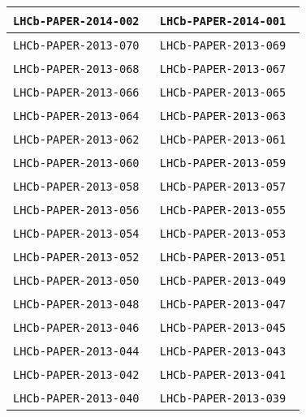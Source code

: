 \begin{center}
\begin{longtable}{ll}
\texttt{LHCb-PAPER-2014-002}~\cite{LHCb-PAPER-2014-002} &
\texttt{LHCb-PAPER-2014-001}~\cite{LHCb-PAPER-2014-001} \\
\midrule
\texttt{LHCb-PAPER-2013-070}~\cite{LHCb-PAPER-2013-070} &
\texttt{LHCb-PAPER-2013-069}~\cite{LHCb-PAPER-2013-069} \\
\texttt{LHCb-PAPER-2013-068}~\cite{LHCb-PAPER-2013-068} &
\texttt{LHCb-PAPER-2013-067}~\cite{LHCb-PAPER-2013-067} \\
\texttt{LHCb-PAPER-2013-066}~\cite{LHCb-PAPER-2013-066} &
\texttt{LHCb-PAPER-2013-065}~\cite{LHCb-PAPER-2013-065} \\
\texttt{LHCb-PAPER-2013-064}~\cite{LHCb-PAPER-2013-064} &
\texttt{LHCb-PAPER-2013-063}~\cite{LHCb-PAPER-2013-063} \\
\texttt{LHCb-PAPER-2013-062}~\cite{LHCb-PAPER-2013-062} &
\texttt{LHCb-PAPER-2013-061}~\cite{LHCb-PAPER-2013-061} \\
\texttt{LHCb-PAPER-2013-060}~\cite{LHCb-PAPER-2013-060} &
\texttt{LHCb-PAPER-2013-059}~\cite{LHCb-PAPER-2013-059} \\
\texttt{LHCb-PAPER-2013-058}~\cite{LHCb-PAPER-2013-058} &
\texttt{LHCb-PAPER-2013-057}~\cite{LHCb-PAPER-2013-057} \\
\texttt{LHCb-PAPER-2013-056}~\cite{LHCb-PAPER-2013-056} &
\texttt{LHCb-PAPER-2013-055}~\cite{LHCb-PAPER-2013-055} \\
\texttt{LHCb-PAPER-2013-054}~\cite{LHCb-PAPER-2013-054} &
\texttt{LHCb-PAPER-2013-053}~\cite{LHCb-PAPER-2013-053} \\
\texttt{LHCb-PAPER-2013-052}~\cite{LHCb-PAPER-2013-052} &
\texttt{LHCb-PAPER-2013-051}~\cite{LHCb-PAPER-2013-051} \\
\texttt{LHCb-PAPER-2013-050}~\cite{LHCb-PAPER-2013-050} &
\texttt{LHCb-PAPER-2013-049}~\cite{LHCb-PAPER-2013-049} \\
\texttt{LHCb-PAPER-2013-048}~\cite{LHCb-PAPER-2013-048} &
\texttt{LHCb-PAPER-2013-047}~\cite{LHCb-PAPER-2013-047} \\
\texttt{LHCb-PAPER-2013-046}~\cite{LHCb-PAPER-2013-046} &
\texttt{LHCb-PAPER-2013-045}~\cite{LHCb-PAPER-2013-045} \\
\texttt{LHCb-PAPER-2013-044}~\cite{LHCb-PAPER-2013-044} &
\texttt{LHCb-PAPER-2013-043}~\cite{LHCb-PAPER-2013-043} \\
\texttt{LHCb-PAPER-2013-042}~\cite{LHCb-PAPER-2013-042} &
\texttt{LHCb-PAPER-2013-041}~\cite{LHCb-PAPER-2013-041} \\
\texttt{LHCb-PAPER-2013-040}~\cite{LHCb-PAPER-2013-040} &
\texttt{LHCb-PAPER-2013-039}~\cite{LHCb-PAPER-2013-039} \\

\end{longtable}
\end{center}

